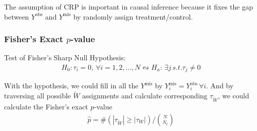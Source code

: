 The assumption of CRP is important in causal inference because it fixes the gap between $ Y^\mathrm{obs}  $ and $ Y^\mathrm{mis} $ by randomly assign treatment/control.


\subsubsection{Fisher's Exact $ p $-value}

Test of Fisher's Sharp Null Hypothesis:
\begin{align}
    H_0:\tau_i=0,\,\forall i=1,2,\ldots,N  \leftrightsquigarrow H_a:\,\exists j\,s.t. \tau_j\neq 0
\end{align}

With the hypothesis, we could fill in all the $ Y^\mathrm{mis}  $ by $ Y^\mathrm{mis}_i=Y^\mathrm{obs}_i   \,\forall i$. And by traversing all possible $ \tilde{W} $ assignments and calculate corresponding $ \tau_{\tilde{W}} $, we could calculate the Fisher's exact $ p $-value
\begin{align}
     \hat{p}={\#(|\tau_{\tilde{W}}|\geq |\tau_{W}|)}\bigg/\binom{N}{N_t}
\end{align}

